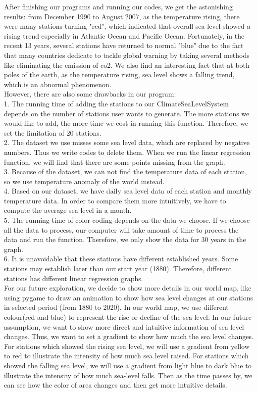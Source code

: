 \documentclass[fontsize=11pt]{article}
\begin{document}
    After finishing our programs and running our codes, we get the astonishing results: from December 1990 to August 2007, as the temperature rising, there were many stations turning "red", which indicated that overall sea level showed a rising trend especially in Atlantic Ocean and Pacific Ocean. Fortunately, in the recent 13 years, several stations have returned to normal "blue" due to the fact that many countries dedicate to tackle global warning by taking several methods like eliminating the emission of co2. We also find an interesting fact that at both poles of the earth, as the temperature rising, sea level shows a falling trend, which is an abnormal phenomenon.\\
    However, there are also some drawbacks in our program:\\
    1. The running time of adding the stations to our ClimateSeaLevelSystem depends on the number of stations user wants to generate. The more stations we would like to add, the more time we cost in running this function. Therefore, we set the limitation of 20 stations.\\
    2. The dataset we use misses some sea level data, which are replaced by negative numbers. Thus we write codes to delete them. When we run the linear regression function, we will find that there are some points missing from the graph.\\
    3. Because of the dataset, we can not find the temperature data of each station, so we use temperature anomaly of the world instead. \\
    4. Based on our dataset, we have daily sea level data of each station and monthly temperature data. In order to compare them more intuitively, we have to compute the average sea level in a month. \\
    5. The running time of color coding depends on the data we choose. If we choose all the data to process, our computer will take amount of time to process the data and run the function. Therefore, we only show the data for 30 years in the graph.\\
    6. It is unavoidable that these stations have different established years. Some stations may establish later than our start year (1880). Therefore, different stations has different linear regression graphs.\\
    For our future exploration, we decide to show more details in our world map, like using pygame to draw an animation to show how sea level changes at our stations in selected period (from 1880 to 2020). In our world map, we use different colour(red and blue) to represent the rise or decline of the sea level. In our future assumption, we want to show more direct and intuitive information of sea level changes. Thus, we want to set a gradient to show how much the sea level changes. For stations which showed the rising sea level, we will use a gradient from yellow to red to illustrate the intensity of how much sea level raised. For stations which showed the falling sea level, we will use a gradient from light blue to dark blue to illustrate the intensity of how much sea-level falls. Then as the time passes by, we can see how the color of area changes and then get more intuitive details.
\end{document}
